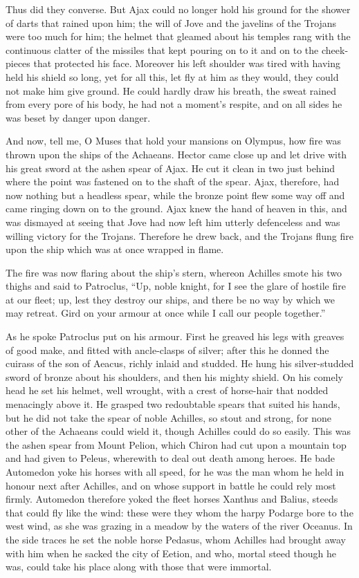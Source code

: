 Thus did they converse. But Ajax could no longer hold his ground for the
shower of darts that rained upon him; the will of Jove and the javelins of
the Trojans were too much for him; the helmet that gleamed about his
temples rang with the continuous clatter of the missiles that kept pouring
on to it and on to the cheek-pieces that protected his face. Moreover his
left shoulder was tired with having held his shield so long, yet for all
this, let fly at him as they would, they could not make him give ground.
He could hardly draw his breath, the sweat rained from every pore of his
body, he had not a moment’s respite, and on all sides he was beset by
danger upon danger.

And now, tell me, O Muses that hold your mansions on Olympus, how fire was
thrown upon the ships of the Achaeans. Hector came close up and let drive
with his great sword at the ashen spear of Ajax. He cut it clean in two
just behind where the point was fastened on to the shaft of the spear.
Ajax, therefore, had now nothing but a headless spear, while the bronze
point flew some way off and came ringing down on to the ground. Ajax knew
the hand of heaven in this, and was dismayed at seeing that Jove had now
left him utterly defenceless and was willing victory for the Trojans.
Therefore he drew back, and the Trojans flung fire upon the ship which was
at once wrapped in flame.

The fire was now flaring about the ship’s stern, whereon Achilles smote
his two thighs and said to Patroclus, “Up, noble knight, for I see the
glare of hostile fire at our fleet; up, lest they destroy our ships, and
there be no way by which we may retreat. Gird on your armour at once while
I call our people together.”

As he spoke Patroclus put on his armour. First he greaved his legs with
greaves of good make, and fitted with ancle-clasps of silver; after this
he donned the cuirass of the son of Aeacus, richly inlaid and studded. He
hung his silver-studded sword of bronze about his shoulders, and then his
mighty shield. On his comely head he set his helmet, well wrought, with a
crest of horse-hair that nodded menacingly above it. He grasped two
redoubtable spears that suited his hands, but he did not take the spear of
noble Achilles, so stout and strong, for none other of the Achaeans could
wield it, though Achilles could do so easily. This was the ashen spear
from Mount Pelion, which Chiron had cut upon a mountain top and had given
to Peleus, wherewith to deal out death among heroes. He bade Automedon
yoke his horses with all speed, for he was the man whom he held in honour
next after Achilles, and on whose support in battle he could rely most
firmly. Automedon therefore yoked the fleet horses Xanthus and Balius,
steeds that could fly like the wind: these were they whom the harpy
Podarge bore to the west wind, as she was grazing in a meadow by the
waters of the river Oceanus. In the side traces he set the noble horse
Pedasus, whom Achilles had brought away with him when he sacked the city
of Eetion, and who, mortal steed though he was, could take his place along
with those that were immortal.

